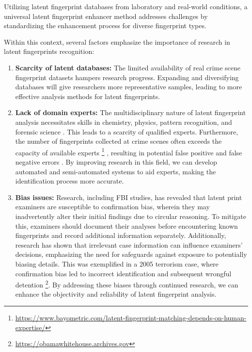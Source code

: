 \documentclass[twocolumn, switch]{article} %
\begin{document}
Utilizing latent fingerprint databases from laboratory and real-world conditions, a universal latent fingerprint enhancer method addresses challenges by standardizing the enhancement process for diverse fingerprint types. 

Within this context, several factors emphasize the importance of research in latent fingerprints recognition: 

\begin{enumerate}
    \item \textbf{Scarcity of latent databases:} The limited availability of real crime scene fingerprint datasets hampers research progress. Expanding and diversifying databases will give researchers more representative samples, leading to more effective analysis methods for latent fingerprints.
    \item \textbf{Lack of domain experts:}  The multidisciplinary nature of latent fingerprint analysis necessitates skills in chemistry, physics, pattern recognition, and forensic science \cite{sankaran2014latent}. This leads to a scarcity of qualified experts. Furthermore, the number of fingerprints collected at crime scenes often exceeds the capacity of available experts
    \footnote{\href{https://www.bayometric.com/latent-fingerprint-matching-depends-on-human-expertise/}{https://www.bayometric.com/latent-fingerprint-matching-depends-on-human-expertise/}}
    , resulting in potential false positive and false negative errors \cite{ulery2011accuracy}. By improving research in this field, we can develop automated and semi-automated systems to aid experts, making the identification process more accurate. 
    \item \textbf{Bias issues:} Research, including FBI studies, has revealed that latent print examiners are susceptible to confirmation bias, wherein they may inadvertently alter their initial findings due to circular reasoning. To mitigate this, examiners should document their analyses before encountering known fingerprints and record additional information separately. Additionally, research has shown that irrelevant case information can influence examiners' decisions, emphasizing the need for safeguards against exposure to potentially biasing details. This was exemplified in a 2005 terrorism case, where confirmation bias led to incorrect identification and subsequent wrongful detention \footnote{\href{https://obamawhitehouse.archives.gov/sites/default/files/microsites/ostp/PCAST/pcast_forensic_science_report_final.pdf}{https://obamawhitehouse.archives.gov}}. By addressing these biases through continued research, we can enhance the objectivity and reliability of latent fingerprint analysis. 
\end{enumerate}
\end{document}
